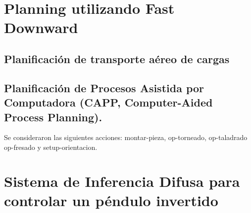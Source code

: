 \documentclass{article}
\begin{document}
\section{Planning utilizando Fast Downward}
    
\subsection{Planificación de transporte aéreo de cargas}

\subsection{Planificación de Procesos Asistida por Computadora (CAPP, Computer-Aided Process Planning). }

Se consideraron las siguientes acciones: montar-pieza, op-torneado, op-taladrado op-fresado y setup-orientacion.

\section{Sistema de Inferencia Difusa para controlar un péndulo invertido}
\end{document}
